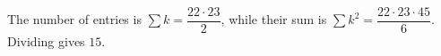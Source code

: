 The number of entries is $\sum k=\dfrac{22\cdot23}{2}$, while their sum is $\sum k^2=\dfrac{22\cdot23\cdot45}{6}$. Dividing gives $\boxed{15}$.

